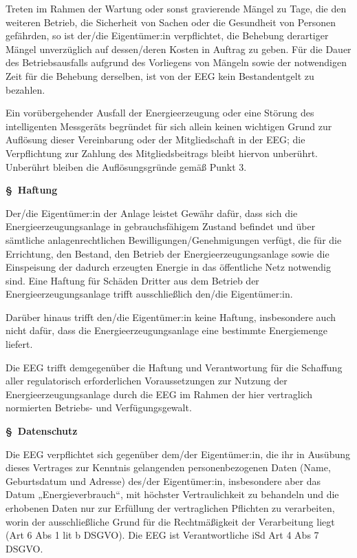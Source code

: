 \documentclass[a4paper,11pt]{article}
\newcounter{parasec}
\newcounter{parasubsec}[parasec]
\newcommand{\parasec}[1]{%
  \stepcounter{parasec}%
  \setcounter{parasubsec}{0}%
  \par\Needspace*{5\baselineskip}%
  \bigskip
  {\large\bfseries\color{tuerkis}\S\ \theparasec\quad #1}\par\nopagebreak
  \smallskip\nopagebreak
}
\begin{document}
Treten im Rahmen der Wartung oder sonst gravierende Mängel zu Tage, die den weiteren Betrieb, die Sicherheit von Sachen oder die Gesundheit von Personen gefährden, so ist der/die Eigentümer:in verpflichtet, die Behebung derartiger Mängel unverzüglich auf dessen/deren Kosten in Auftrag zu geben. Für die Dauer des Betriebsausfalls aufgrund des Vorliegens von Mängeln sowie der notwendigen Zeit für die Behebung derselben, ist von der EEG kein Bestandentgelt zu bezahlen.

Ein vorübergehender Ausfall der Energieerzeugung oder eine Störung des intelligenten Messgeräts begründet für sich allein keinen wichtigen Grund zur Auflösung dieser Vereinbarung oder der Mitgliedschaft in der EEG; die Verpflichtung zur Zahlung des Mitgliedsbeitrags bleibt hiervon unberührt. Unberührt bleiben die Auflösungsgründe gemäß Punkt 3.

\parasec{Haftung}

Der/die Eigentümer:in der Anlage leistet Gewähr dafür, dass sich die Energieerzeugungsanlage in gebrauchsfähigem Zustand befindet und über sämtliche anlagenrechtlichen Bewilligungen/Genehmigungen verfügt, die für die Errichtung, den Bestand, den Betrieb der Energieerzeugungsanlage sowie die Einspeisung der dadurch erzeugten Energie in das öffentliche Netz notwendig sind. Eine Haftung für Schäden Dritter aus dem Betrieb der Energieerzeugungsanlage trifft ausschließlich den/die Eigentümer:in.

Darüber hinaus trifft den/die Eigentümer:in keine Haftung, insbesondere auch nicht dafür, dass die Energieerzeugungsanlage eine bestimmte Energiemenge liefert.

Die EEG trifft demgegenüber die Haftung und Verantwortung für die Schaffung aller regulatorisch erforderlichen Voraussetzungen zur Nutzung der Energieerzeugungsanlage durch die EEG im Rahmen der hier vertraglich normierten Betriebs- und Verfügungsgewalt.

\parasec{Datenschutz}

Die EEG verpflichtet sich gegenüber dem/der Eigentümer:in, die ihr in Ausübung dieses Vertrages zur Kenntnis gelangenden personenbezogenen Daten (Name, Geburtsdatum und Adresse) des/der Eigentümer:in, insbesondere aber das Datum „Energieverbrauch“, mit höchster Vertraulichkeit zu behandeln und die erhobenen Daten nur zur Erfüllung der vertraglichen Pflichten zu verarbeiten, worin der ausschließliche Grund für die Rechtmäßigkeit der Verarbeitung liegt (Art 6 Abs 1 lit b DSGVO). Die EEG ist Verantwortliche iSd Art 4 Abs 7 DSGVO.
\end{document}
